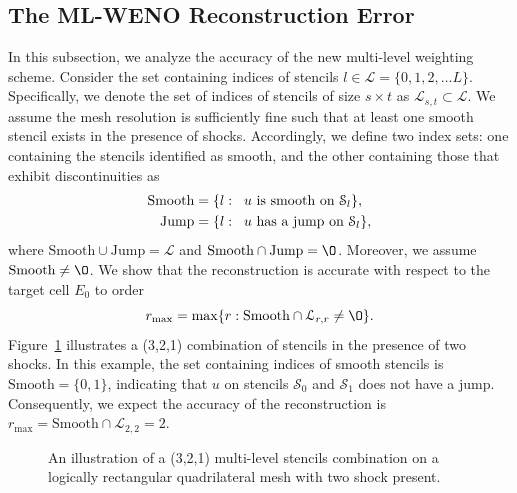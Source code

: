 \subsection{The ML-WENO Reconstruction Error}
In this subsection, we analyze the accuracy of the new multi-level weighting scheme.
Consider the set containing indices of stencils $l \in \mathcal{L} = \{0,1,2,\dots L\}$. 
Specifically, we denote the set of indices of
stencils of size $s\times t$ as $\mathcal{L}_{s,t} \subset \mathcal{L}$.
We assume the mesh resolution is sufficiently fine such that 
at least one smooth stencil exists in the presence of shocks. Accordingly, we define two index sets:
one containing the stencils identified as smooth, and the other containing those that exhibit discontinuities as
\begin{equation}\label{eq:groupstencil}
\begin{aligned}
		  \text{Smooth} &= \{l:\hspace{0.2cm} \text{$u$ is smooth on $\mathcal{S}_l$}\},\\
		  \text{Jump}   &= \{l:\hspace{0.2cm} \text{$u$ has a jump on $\mathcal{S}_l$}\},
\end{aligned}
\end{equation}
where $\text{Smooth} \cup \text{Jump} = \mathcal{L}$ and $\text{Smooth} \cap \text{Jump} = \O$. Moreover, we assume $\text{Smooth}\neq \O$.
We show that the reconstruction is accurate with respect to the target cell $E_0$ to order
\begin{equation}\label{eq:maxr}
r_{\max} = \max\{r: \text{Smooth} \cap \mathcal{L}_{r,r}  \neq \O \}.
\end{equation}
Figure~\ref{fig:stencilshock} illustrates a (3,2,1) combination of stencils in the presence of two shocks.
In this example, the set containing indices of smooth stencils is $\text{Smooth} = \{0, 1 \} $, indicating 
that $u$ on stencils $\mathcal{S}_0$ and $\mathcal{S}_1$ does not have a jump.
Consequently, we expect the accuracy of the reconstruction is $r_{\max} = \text{Smooth} \cap \mathcal{L}_{2,2} = 2$.
\begin{figure}[htb]
\centering

\caption{An illustration of a (3,2,1) multi-level stencils combination on a logically rectangular 
quadrilateral mesh with two shock present.\label{fig:stencilshock}}
\end{figure}

